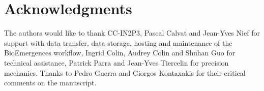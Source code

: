 \section*{Acknowledgments}



The authors would like to thank CC-IN2P3, Pascal Calvat and Jean-Yves Nief for support with data transfer, data storage, hosting and maintenance of the BioEmergences workflow, Ingrid Colin, Audrey Colin and Shuhan Guo for technical assistance, Patrick Parra and Jean-Yves Tiercelin for precision mechanics. Thanks to Pedro Guerra and Giorgos Kontaxakis for their critical comments on the manuscript.







